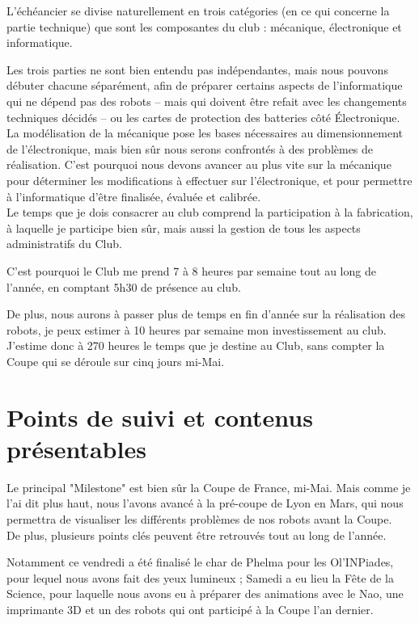 \documentclass[a4paper,11pt]{article} \usepackage[T1]{fontenc} \usepackage[utf8]{inputenc} \usepackage[francais]{babel}
\begin{document}
L'échéancier se divise naturellement en trois catégories (en ce qui concerne la partie technique) que sont les composantes du club : mécanique, électronique et informatique.

Les trois parties ne sont bien entendu pas indépendantes, mais nous pouvons débuter chacune séparément, afin de préparer certains aspects de l'informatique qui ne dépend pas des robots -- mais qui doivent être refait avec les changements techniques décidés -- ou les cartes de protection des batteries côté Électronique.\\

La modélisation de la mécanique pose les bases nécessaires au dimensionnement de l'électronique, mais bien sûr nous serons confrontés à des problèmes de réalisation. C'est pourquoi nous devons avancer au plus vite sur la mécanique pour déterminer les modifications à effectuer sur l'électronique, et pour permettre à l'informatique d'être finalisée, évaluée et calibrée.\\


Le temps que je dois consacrer au club comprend la participation à la fabrication, à laquelle je participe bien sûr, mais aussi la gestion de tous les aspects administratifs du Club.

C'est pourquoi le Club me prend 7 à 8 heures par semaine tout au long de l'année, en comptant 5h30 de présence au club.

De plus, nous aurons à passer plus de temps en fin d'année sur la réalisation des robots, je peux estimer à 10 heures par semaine mon investissement au club.\\

J'estime donc à 270 heures le temps que je destine au Club, sans compter la Coupe qui se déroule sur cinq jours mi-Mai.

\part{Points de suivi et contenus présentables}
Le principal "Milestone" est bien sûr la Coupe de France, mi-Mai. Mais comme je l'ai dit plus haut, nous l'avons avancé à la pré-coupe de Lyon en Mars, qui nous permettra de visualiser les différents problèmes de nos robots avant la Coupe.\\

De plus, plusieurs points clés peuvent être retrouvés tout au long de l'année.

Notamment ce vendredi a été finalisé le char de Phelma pour les Ol'INPiades, pour lequel nous avons fait des yeux lumineux ; Samedi a eu lieu la Fête de la Science, pour laquelle nous avons eu à préparer des animations avec le Nao, une imprimante 3D et un des robots qui ont participé à la Coupe l'an dernier.
\end{document}
